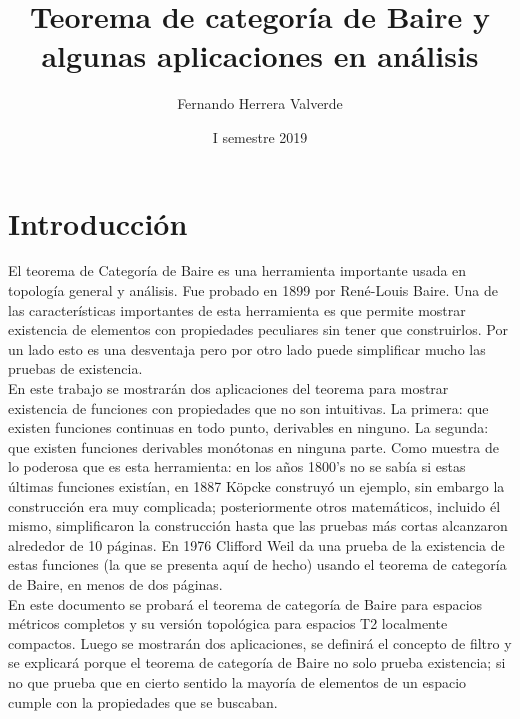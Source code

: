 \documentclass{article}
\title{Teorema de categoría de Baire y algunas aplicaciones en análisis}
\author{Fernando Herrera Valverde}
\date{I semestre 2019}
\theoremstyle{definition}
\begin{document}
\maketitle

\section{Introducción}

El teorema de Categoría de Baire es una herramienta importante usada en topología general y análisis. Fue probado en 1899 por René-Louis Baire. Una de las características importantes de esta herramienta es que permite mostrar existencia de elementos con propiedades peculiares sin tener que construirlos. Por un lado esto es una desventaja pero por otro lado puede simplificar mucho las pruebas de existencia.\\
En este trabajo se mostrarán dos aplicaciones del teorema para mostrar existencia de funciones con propiedades que no son intuitivas. La primera: que existen funciones continuas en todo punto, derivables en ninguno. La segunda: que existen funciones derivables monótonas en ninguna parte.
Como muestra de lo poderosa que es esta herramienta: en los años 1800's no se sabía si estas últimas funciones existían, en 1887 Köpcke construyó un ejemplo, sin embargo la construcción era muy complicada; posteriormente otros matemáticos, incluido él mismo, simplificaron la construcción hasta que las pruebas más cortas alcanzaron alrededor de 10 páginas. En 1976 Clifford Weil da una prueba de la existencia de estas funciones (la que se presenta aquí de hecho) usando el teorema de categoría de Baire, en menos de dos páginas.\\
En este documento se probará el teorema de categoría de Baire para espacios métricos completos y su versión topológica para espacios T2 localmente compactos. Luego se mostrarán dos aplicaciones, se definirá el concepto de filtro y se explicará porque el teorema de categoría de Baire no solo prueba existencia; si no que prueba que en cierto sentido la mayoría de elementos de un espacio cumple con la propiedades que se buscaban. 
\end{document}
